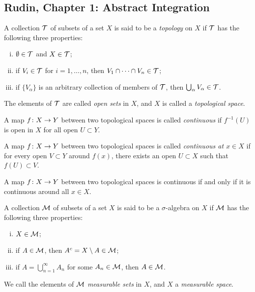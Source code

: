 \subsection{Rudin, Chapter 1: Abstract Integration}

\begin{definition}
  A collection $\mathcal{T}$ of subsets of a set $X$ is said to be a \emph{topology} on $X$ if $\mathcal{T}$ has the following three properties:
  \begin{enumerate}[(i)]
  \item $\emptyset \in \mathcal{T}$ and $X \in \mathcal{T}$;
  \item if $V_i \in \mathcal{T}$ for $i = 1, \dots, n$, then $V_1 \cap \cdots \cap V_n \in \mathcal{T}$;
  \item if $\{V_\alpha\}$ is an arbitrary collection of members of $\mathcal{T}$, then $\bigcup_\alpha V_\alpha \in \mathcal{T}$.
  \end{enumerate}
  The elements of $\mathcal{T}$ are called \emph{open sets} in $X$, and $X$ is called a \emph{topological space}.
\end{definition}

\begin{definition}
  A map $f \colon X \rightarrow Y$ between two topological spaces is called \emph{continuous} if $f^{-1}(U)$ is open in $X$ for all open $U \subset Y$.

  A map $f \colon X \rightarrow Y$ between two topological spaces is called \emph{continuous at $x \in X$} if for every open $V \subset Y$ around $f(x)$, there exists an open $U \subset X$ such that $f(U) \subset V$.
\end{definition}

\begin{proposition}
  A map $f \colon X \rightarrow Y$ between two topological spaces is continuous if and only if it is continuous around all $x \in X$.
\end{proposition}

\begin{definition}
  A collection $\mathcal{M}$ of subsets of a set $X$ is said to be a $\sigma$-algebra on $X$ if $\mathcal{M}$ has the following three properties:
  \begin{enumerate}[(i)]
  \item $X \in \mathcal{M}$;
  \item if $A \in \mathcal{M}$, then $A^c = X \setminus A \in \mathcal{M}$;
  \item if $A = \bigcup_{n=1}^\infty A_n$ for some $A_n \in \mathcal{M}$, then $A \in \mathcal{M}$.
  \end{enumerate}
  We call the elements of $\mathcal{M}$ \emph{measurable sets} in $X$, and $X$ a \emph{measurable space}.
\end{definition}

